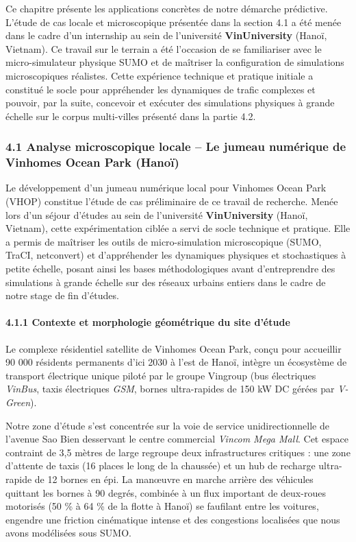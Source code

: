 \documentclass[10pt, a4paper]{article}
\begin{document}
Ce chapitre présente les applications concrètes de notre démarche
prédictive. L'étude de cas locale et microscopique présentée dans la
section 4.1 a été menée dans le cadre d'un internship au sein de
l'université \textbf{VinUniversity} (Hanoï, Vietnam). Ce travail sur le
terrain a été l'occasion de se familiariser avec le micro-simulateur
physique SUMO et de maîtriser la configuration de simulations
microscopiques réalistes. Cette expérience technique et pratique
initiale a constitué le socle pour appréhender les dynamiques de trafic
complexes et pouvoir, par la suite, concevoir et exécuter des
simulations physiques à grande échelle sur le corpus multi-villes
présenté dans la partie 4.2.

\subsubsection{4.1 Analyse microscopique locale -- Le jumeau numérique
de Vinhomes Ocean Park
(Hanoï)}\label{analyse-microscopique-locale-le-jumeau-numuxe9rique-de-vinhomes-ocean-park-hanouxef}

Le développement d'un jumeau numérique local pour Vinhomes Ocean Park
(VHOP) constitue l'étude de cas préliminaire de ce travail de recherche.
Menée lors d'un séjour d'études au sein de l'université
\textbf{VinUniversity} (Hanoï, Vietnam), cette expérimentation ciblée a
servi de socle technique et pratique. Elle a permis de maîtriser les
outils de micro-simulation microscopique (SUMO, TraCI, netconvert) et
d'appréhender les dynamiques physiques et stochastiques à petite
échelle, posant ainsi les bases méthodologiques avant d'entreprendre des
simulations à grande échelle sur des réseaux urbains entiers dans le
cadre de notre stage de fin d'études.

\paragraph{4.1.1 Contexte et morphologie géométrique du site
d'étude}\label{contexte-et-morphologie-guxe9omuxe9trique-du-site-duxe9tude}

Le complexe résidentiel satellite de Vinhomes Ocean Park, conçu pour
accueillir 90 000 résidents permanents d'ici 2030 à l'est de Hanoï,
intègre un écosystème de transport électrique unique piloté par le
groupe Vingroup (bus électriques \emph{VinBus}, taxis électriques
\emph{GSM}, bornes ultra-rapides de 150 kW DC gérées par
\emph{V-Green}).

Notre zone d'étude s'est concentrée sur la voie de service
unidirectionnelle de l'avenue Sao Bien desservant le centre commercial
\emph{Vincom Mega Mall}. Cet espace contraint de 3,5 mètres de large
regroupe deux infrastructures critiques : une zone d'attente de taxis
(16 places le long de la chaussée) et un hub de recharge ultra-rapide de
12 bornes en épi. La manœuvre en marche arrière des véhicules quittant
les bornes à 90 degrés, combinée à un flux important de deux-roues
motorisés (50 \% à 64 \% de la flotte à Hanoï) se faufilant entre les
voitures, engendre une friction cinématique intense et des congestions
localisées que nous avons modélisées sous SUMO.
\end{document}
